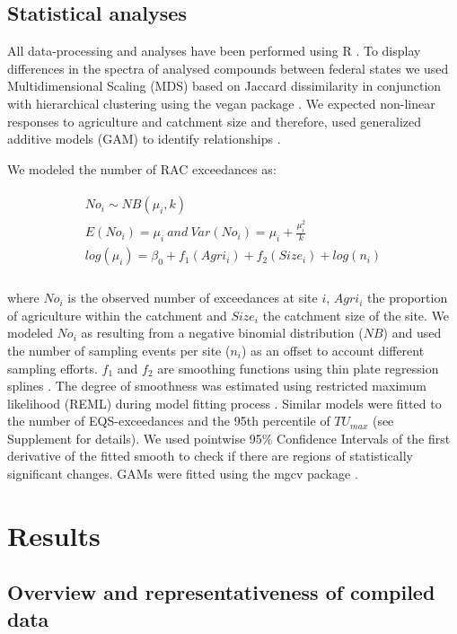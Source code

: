 \documentclass[journal=esthag,manuscript=article]{achemso}
\begin{document}
\subsection{Statistical analyses}

All data-processing and analyses have been performed using R \citep{r_core_team_r:_2016}.
To display differences in the spectra of analysed compounds between federal states we used Multidimensional Scaling (MDS) based on Jaccard dissimilarity in conjunction with hierarchical clustering using the vegan package \citep{oksanen_vegan:_2016}.
We expected non-linear responses to agriculture and catchment size and therefore, used generalized additive models (GAM) to identify relationships \citep{fewster_analysis_2000}.

We modeled the number of RAC exceedances as:

\begin{align}
\begin{split}
  No_i \sim NB(\mu_i, k) \\
  E(No_i) = \mu_i~and~Var(No_i) = \mu_i + \frac{\mu_i^2}{k} \\
  log(\mu_i)= \beta_0 + f_1(Agri_i) + f_2(Size_i) + log(n_i) \\
\end{split}
\end{align}

where $No_i$ is the observed number of exceedances at site $i$, $Agri_i$ the proportion of agriculture within the catchment and $Size_i$ the catchment size of the site. 
We modeled $No_i$ as resulting from a negative binomial distribution ($NB$) and used the number of sampling events per site ($n_i$) as an offset to account different sampling efforts. 
$f_1$ and $f_2$ are smoothing functions using thin plate regression splines \citep{wood_thin_2003}.
The degree of smoothness was estimated using restricted maximum likelihood (REML) during model fitting process \citep{wood_fast_2011}.
Similar models were fitted to the number of EQS-exceedances and the 95th percentile of $TU_{max}$ (see Supplement for details). 
We used pointwise 95\% Confidence Intervals of the first derivative of the fitted smooth to check if there are regions of statistically significant changes.
GAMs were fitted using the mgcv package \citep{wood_fast_2011}.


\section{Results}
\subsection{Overview and representativeness of compiled data}
\end{document}
